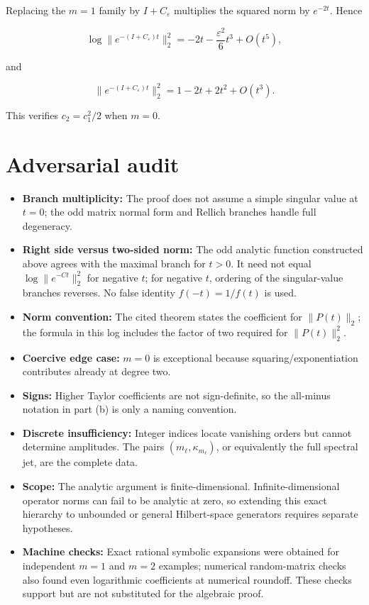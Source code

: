 \documentclass[11pt,a4paper]{article}
\providecommand{\tightlist}{%
  \setlength{\itemsep}{0pt}\setlength{\parskip}{0pt}}
\begin{document}
Replacing the \(m=1\) family by \(I+C_\varepsilon\) multiplies the squared norm by \(e^{-2t}\). Hence

\[
\log\|e^{-(I+C_\varepsilon)t}\|_2^2
=-2t-\frac{\varepsilon^2}{6}t^3+O(t^5),
\]

and

\[
\|e^{-(I+C_\varepsilon)t}\|_2^2
=1-2t+2t^2+O(t^3).
\]

This verifies \(c_2=c_1^2/2\) when \(m=0\).

\section{Adversarial audit}\label{adversarial-audit}

\begin{itemize}
\tightlist
\item
  \textbf{Branch multiplicity:} The proof does not assume a simple singular value at \(t=0\); the odd matrix normal form and Rellich branches handle full degeneracy.
\item
  \textbf{Right side versus two-sided norm:} The odd analytic function constructed above agrees with the maximal branch for \(t>0\). It need not equal \(\log\lVert e^{-Ct}\rVert_2^2\) for negative \(t\); for negative \(t\), ordering of the singular-value branches reverses. No false identity \(f(-t)=1/f(t)\) is used.
\item
  \textbf{Norm convention:} The cited theorem states the coefficient for \(\lVert P(t)\rVert_2\); the formula in this log includes the factor of two required for \(\lVert P(t)\rVert_2^2\).
\item
  \textbf{Coercive edge case:} \(m=0\) is exceptional because squaring/exponentiation contributes already at degree two.
\item
  \textbf{Signs:} Higher Taylor coefficients are not sign-definite, so the all-minus notation in part (b) is only a naming convention.
\item
  \textbf{Discrete insufficiency:} Integer indices locate vanishing orders but cannot determine amplitudes. The pairs \((m_\ell,\kappa_{m_\ell})\), or equivalently the full spectral jet, are the complete data.
\item
  \textbf{Scope:} The analytic argument is finite-dimensional. Infinite-dimensional operator norms can fail to be analytic at zero, so extending this exact hierarchy to unbounded or general Hilbert-space generators requires separate hypotheses.
\item
  \textbf{Machine checks:} Exact rational symbolic expansions were obtained for independent \(m=1\) and \(m=2\) examples; numerical random-matrix checks also found even logarithmic coefficients at numerical roundoff. These checks support but are not substituted for the algebraic proof.
\end{itemize}
\end{document}

